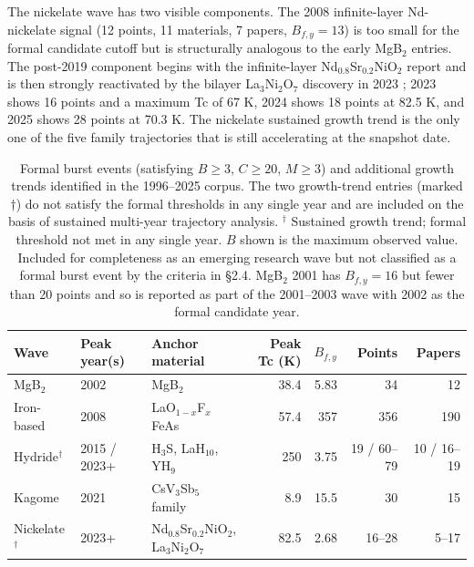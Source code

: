 \documentclass[11pt]{article}
\begin{document}
The nickelate wave has two visible components. The 2008 infinite-layer Nd-nickelate signal (12 points, 11 materials, 7 papers, $B_{f,y}=13$) is too small for the formal candidate cutoff but is structurally analogous to the early MgB$_2$ entries. The post-2019 component begins with the infinite-layer Nd$_{0.8}$Sr$_{0.2}$NiO$_2$ report \cite{li2019nickelate} and is then strongly reactivated by the bilayer La$_3$Ni$_2$O$_7$ discovery in 2023 \cite{sun2023nickelate}; 2023 shows 16 points and a maximum Tc of 67 K, 2024 shows 18 points at 82.5 K, and 2025 shows 28 points at 70.3 K. The nickelate sustained growth trend is the only one of the five family trajectories that is still accelerating at the snapshot date.

\begin{table}[htbp]
  \centering
  \small
  \begin{tabular}{lllrrrr}
  \toprule
  Wave & Peak year(s) & Anchor material & Peak Tc (K) & $B_{f,y}$ & Points & Papers \\
  \midrule
  MgB$_2$              & 2002          & MgB$_2$                            & 38.4   & 5.83   & 34   & 12  \\
  Iron-based           & 2008          & LaO$_{1-x}$F$_x$FeAs               & 57.4   & 357    & 356  & 190 \\
  Hydride$^{\dagger}$  & 2015 / 2023+  & H$_3$S, LaH$_{10}$, YH$_9$         & 250    & 3.75 & 19 / 60--79 & 10 / 16--19 \\
  Kagome               & 2021          & CsV$_3$Sb$_5$ family               & 8.9    & 15.5   & 30   & 15  \\
  Nickelate$^{\dagger}$ & 2023+        & Nd$_{0.8}$Sr$_{0.2}$NiO$_2$, La$_3$Ni$_2$O$_7$ & 82.5 & 2.68 & 16--28 & 5--17 \\
  \bottomrule
  \end{tabular}
  \caption{Formal burst events (satisfying $B \geq 3$, $C \geq 20$, $M \geq 3$) and additional growth trends identified in the 1996--2025 corpus. The two growth-trend entries (marked $\dagger$) do not satisfy the formal thresholds in any single year and are included on the basis of sustained multi-year trajectory analysis. $^{\dagger}$ Sustained growth trend; formal threshold not met in any single year. $B$ shown is the maximum observed value. Included for completeness as an emerging research wave but not classified as a formal burst event by the criteria in \S2.4. MgB$_2$ 2001 has $B_{f,y}=16$ but fewer than 20 points and so is reported as part of the 2001--2003 wave with 2002 as the formal candidate year.}
  \label{tab:bursts}
\end{table}
\end{document}
